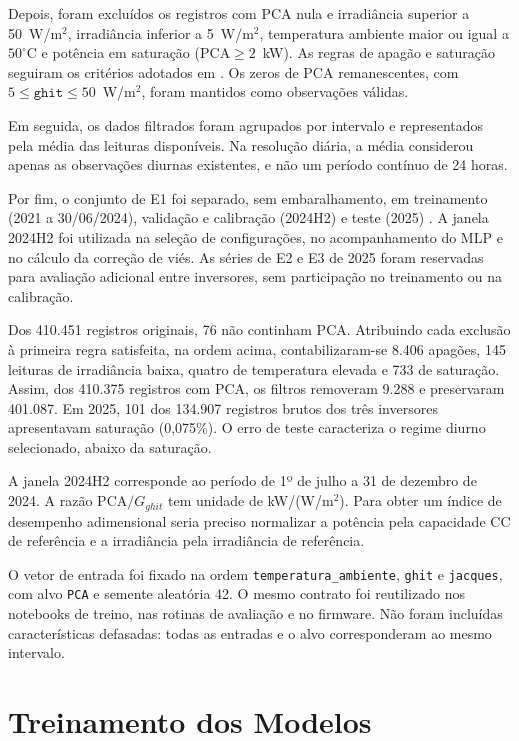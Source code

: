 Depois, foram excluídos os registros com PCA nula e irradiância superior a
50~W/m$^2$, irradiância inferior a 5~W/m$^2$, temperatura ambiente maior ou
igual a $50^\circ$C e potência em saturação ($\mathrm{PCA}\geq2$~kW). As
regras de apagão e saturação seguiram os critérios adotados em
\cite{balfour2021,severiano2026}. Os zeros de PCA remanescentes, com
$5\leq\texttt{ghit}\leq50$~W/m$^2$, foram mantidos como observações válidas.

Em seguida, os dados filtrados foram agrupados por intervalo e representados
pela média das leituras disponíveis. Na resolução diária, a média considerou
apenas as observações diurnas existentes, e não um período contínuo de 24
horas.

Por fim, o conjunto de E1 foi separado, sem embaralhamento, em treinamento
(2021 a 30/06/2024), validação e calibração (2024H2) e teste (2025)
\cite{albelali2025,cerqueira2019}. A janela 2024H2 foi utilizada na seleção
de configurações, no acompanhamento do MLP e no cálculo da correção de viés.
As séries de E2 e E3 de 2025 foram reservadas para avaliação adicional entre
inversores, sem participação no treinamento ou na calibração.

Dos 410.451 registros originais, 76 não continham PCA. Atribuindo cada
exclusão à primeira regra satisfeita, na ordem acima, contabilizaram-se
8.406 apagões, 145 leituras de irradiância baixa, quatro de temperatura
elevada e 733 de saturação. Assim, dos 410.375 registros com PCA, os filtros
removeram 9.288 e preservaram 401.087. Em 2025, 101 dos 134.907 registros
brutos dos três inversores apresentavam saturação (0,075\%). O erro de teste
caracteriza o regime diurno selecionado, abaixo da saturação.

A janela 2024H2 corresponde ao período de 1º de julho a 31 de dezembro de
2024. A razão $\mathrm{PCA}/G_{ghit}$ tem unidade de kW/(W/m$^2$). Para
obter um índice de desempenho adimensional seria preciso normalizar a
potência pela capacidade CC de referência e a irradiância pela irradiância
de referência.

O vetor de entrada foi fixado na ordem \texttt{temperatura\_ambiente},
\texttt{ghit} e \texttt{jacques}, com alvo \texttt{PCA} e semente aleatória
42. O mesmo contrato foi reutilizado nos notebooks de treino, nas rotinas de
avaliação e no firmware. Não foram incluídas características defasadas:
todas as entradas e o alvo corresponderam ao mesmo intervalo.

\section{Treinamento dos Modelos}

